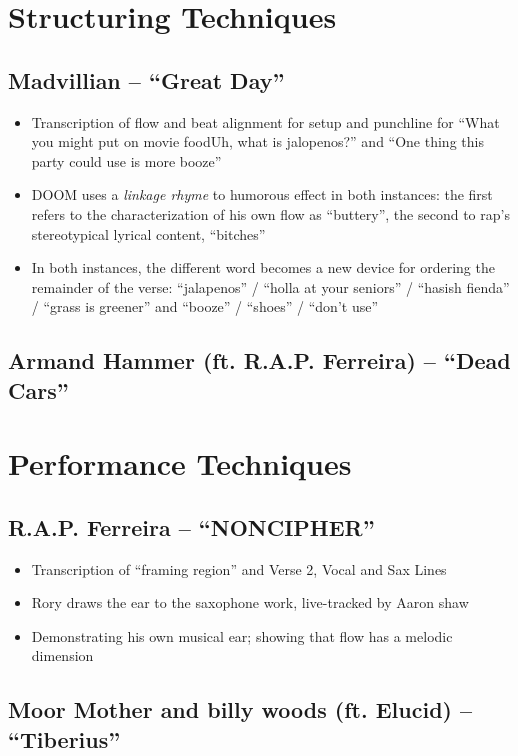 \section{Structuring Techniques}
\subsection*{\centering Madvillian -- ``Great Day''}

\begin{itemize}
    \item Transcription of flow and beat alignment for setup and punchline for ``What you might put on 
    movie food\textellipsis Uh, what is jalopenos?'' and ``One thing this party could use is more\textellipsis
    booze''
    \item DOOM uses a \emph{linkage rhyme} to humorous effect in both instances: the first refers to 
    the characterization of his own flow as ``buttery'', the second to rap's stereotypical lyrical content,
    ``bitches''
    \item In both instances, the different word becomes a new device for ordering the remainder of the 
    verse: ``jalapenos'' / ``holla at your seniors'' / ``hasish fienda'' / ``grass is greener'' and 
    ``booze'' / ``shoes'' / ``don't use''
\end{itemize}

\subsection*{\centering Armand Hammer (ft. R.A.P. Ferreira) -- ``Dead Cars''}

\section{Performance Techniques}
\subsection*{\centering R.A.P. Ferreira -- ``NONCIPHER''}
    \begin{itemize}
        \item Transcription of ``framing region'' and Verse 2, Vocal and Sax Lines
        \item Rory draws the ear to the saxophone work, live-tracked by Aaron shaw
        \item Demonstrating his own musical ear; showing that flow has a melodic dimension
    \end{itemize}
  
\subsection*{\centering Moor Mother and billy woods (ft. Elucid)  -- ``Tiberius''}

